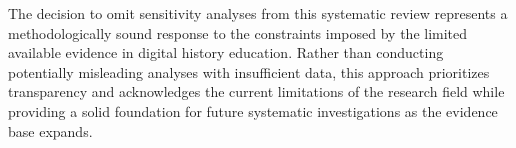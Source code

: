 \documentclass[
hf,
]{ceurart}
\begin{document}
The decision to omit sensitivity analyses from this systematic review represents a methodologically sound response to the constraints imposed by the limited available evidence in digital history education. Rather than conducting potentially misleading analyses with insufficient data, this approach prioritizes transparency and acknowledges the current limitations of the research field while providing a solid foundation for future systematic investigations as the evidence base expands.






\end{document}
